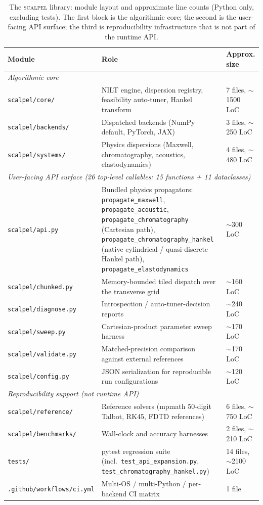 \documentclass[manuscript,review]{acmart}
\newcommand{\scalpel}{\textsc{scalpel}}
\begin{document}
\begin{table}[h]
\centering
\small
\caption{The \scalpel{} library: module layout and approximate line
counts (Python only, excluding tests). The first block is the
algorithmic core; the second is the user-facing API surface; the
third is reproducibility infrastructure that is not part of the
runtime API.}\label{tab:library-layout}
\begin{tabular}{lll}
\toprule
Module & Role & Approx. size \\
\midrule
\multicolumn{3}{l}{\emph{Algorithmic core}} \\
\texttt{scalpel/core/} & NILT engine, dispersion registry, feasibility auto-tuner, Hankel transform & 7 files, $\sim$1500 LoC \\
\texttt{scalpel/backends/} & Dispatched backends (NumPy default, PyTorch, JAX) & 3 files, $\sim$250 LoC \\
\texttt{scalpel/systems/} & Physics dispersions (Maxwell, chromatography, acoustics, elastodynamics) & 4 files, $\sim$480 LoC \\
\midrule
\multicolumn{3}{l}{\emph{User-facing API surface (26 top-level callables: 15 functions + 11 dataclasses)}} \\
\texttt{scalpel/api.py} & Bundled physics propagators: \texttt{propagate\_maxwell}, \texttt{propagate\_acoustic}, \texttt{propagate\_chromatography} (Cartesian path), \texttt{propagate\_chromatography\_hankel} (native cylindrical / quasi-discrete Hankel path), \texttt{propagate\_elastodynamics} & $\sim$300 LoC \\
\texttt{scalpel/chunked.py} & Memory-bounded tiled dispatch over the transverse grid & $\sim$160 LoC \\
\texttt{scalpel/diagnose.py} & Introspection / auto-tuner-decision reports & $\sim$240 LoC \\
\texttt{scalpel/sweep.py} & Cartesian-product parameter sweep harness & $\sim$170 LoC \\
\texttt{scalpel/validate.py} & Matched-precision comparison against external references & $\sim$170 LoC \\
\texttt{scalpel/config.py} & JSON serialization for reproducible run configurations & $\sim$120 LoC \\
\midrule
\multicolumn{3}{l}{\emph{Reproducibility support (not runtime API)}} \\
\texttt{scalpel/reference/} & Reference solvers (mpmath 50-digit Talbot, RK45, FDTD references) & 6 files, $\sim$750 LoC \\
\texttt{scalpel/benchmarks/} & Wall-clock and accuracy harnesses & 2 files, $\sim$210 LoC \\
\texttt{tests/} & pytest regression suite (incl.\ \texttt{test\_api\_expansion.py}, \texttt{test\_chromatography\_hankel.py}) & 14 files, $\sim$2100 LoC \\
\texttt{.github/workflows/ci.yml} & Multi-OS / multi-Python / per-backend CI matrix & 1 file \\
\bottomrule
\end{tabular}
\end{table}
\end{document}
